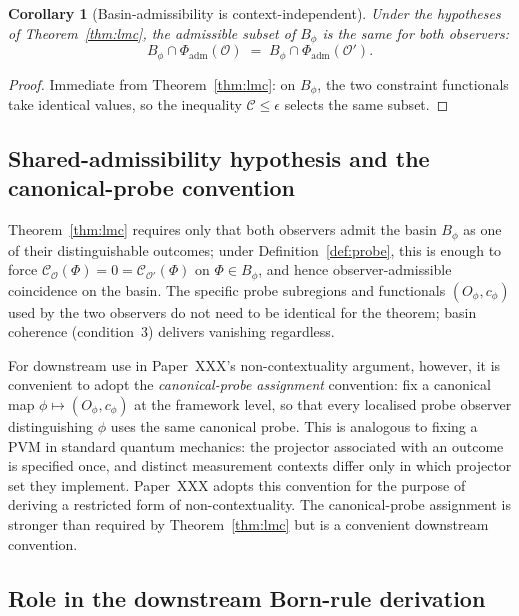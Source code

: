 \documentclass[12pt]{article}
\newtheorem{corollary}[theorem]{Corollary}
\newcommand{\Ocal}{\mathcal{O}}
\newcommand{\Ccal}{\mathcal{C}}
\begin{document}
\begin{corollary}[Basin-admissibility is context-independent]\label{cor:basin_admissible}
Under the hypotheses of Theorem~\ref{thm:lmc}, the admissible subset of $B_\phi$ is the same for both observers:
\begin{equation}
    B_\phi \cap \Phi_{\mathrm{adm}}(\Ocal)
    \;=\; B_\phi \cap \Phi_{\mathrm{adm}}(\Ocal').
\end{equation}
\end{corollary}

\begin{proof}
Immediate from Theorem~\ref{thm:lmc}: on $B_\phi$, the two constraint functionals take identical values, so the inequality $\Ccal \leq \epsilon$ selects the same subset.
\end{proof}

\subsection{Shared-admissibility hypothesis and the canonical-probe convention}\label{subsec:same_c}

Theorem~\ref{thm:lmc} requires only that both observers admit the basin $B_\phi$ as one of their distinguishable outcomes; under Definition~\ref{def:probe}, this is enough to force $\Ccal_\Ocal(\Phi) = 0 = \Ccal_{\Ocal'}(\Phi)$ on $\Phi \in B_\phi$, and hence observer-admissible coincidence on the basin. The specific probe subregions and functionals $(O_\phi, c_\phi)$ used by the two observers do not need to be identical for the theorem; basin coherence (condition~3) delivers vanishing regardless.

For downstream use in Paper~XXX's non-contextuality argument, however, it is convenient to adopt the \emph{canonical-probe assignment} convention: fix a canonical map $\phi \mapsto (O_\phi, c_\phi)$ at the framework level, so that every localised probe observer distinguishing $\phi$ uses the same canonical probe. This is analogous to fixing a PVM in standard quantum mechanics: the projector associated with an outcome is specified once, and distinct measurement contexts differ only in which projector set they implement. Paper~XXX adopts this convention for the purpose of deriving a restricted form of non-contextuality. The canonical-probe assignment is stronger than required by Theorem~\ref{thm:lmc} but is a convenient downstream convention.

\subsection{Role in the downstream Born-rule derivation}\label{subsec:role_xxx_placement}
\end{document}
